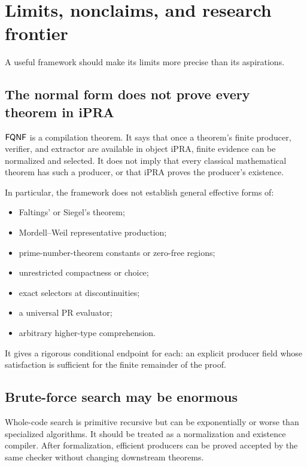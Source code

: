 \section{Limits, nonclaims, and research frontier}

A useful framework should make its limits more precise than its aspirations.

\subsection{The normal form does not prove every theorem in iPRA}

\(\mathsf{FQNF}\) is a compilation theorem.  It says that once a theorem's finite
producer, verifier, and extractor are available in object iPRA, finite evidence
can be normalized and selected.  It does not imply that every classical
mathematical theorem has such a producer, or that iPRA proves the producer's
existence.

In particular, the framework does not establish general effective forms of:

\begin{itemize}
\item Faltings' or Siegel's theorem;
\item Mordell--Weil representative production;
\item prime-number-theorem constants or zero-free regions;
\item unrestricted compactness or choice;
\item exact selectors at discontinuities;
\item a universal PR evaluator;
\item arbitrary higher-type comprehension.
\end{itemize}

It gives a rigorous conditional endpoint for each: an explicit producer field
whose satisfaction is sufficient for the finite remainder of the proof.

\subsection{Brute-force search may be enormous}

Whole-code search is primitive recursive but can be exponentially or worse
than specialized algorithms.  It should be treated as a normalization and
existence compiler.  After formalization, efficient producers can be proved
accepted by the same checker without changing downstream theorems.

